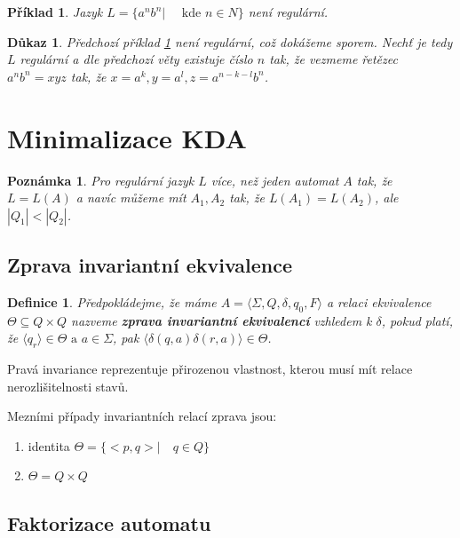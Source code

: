 \documentclass[10pt, a4paper, titlepage]{article}
\theoremstyle{note}
\newtheorem{definice}{Definice}
\newtheorem{dukaz}{Důkaz}
\newtheorem{priklad}{Příklad}
\newtheorem{poznamka}{Poznámka}
\begin{document}
\begin{priklad}\label{priklad-reg}
 Jazyk $L = \lbrace a^{n}b^{n} | \quad \text{ kde } n \in N \rbrace$ není regulární.
\end{priklad}

\begin{dukaz}
 Předchozí příklad \ref{priklad-reg} není regulární, což dokážeme sporem. Nechť je tedy $L$ regulární a dle předchozí
věty existuje číslo $n$ tak, že vezmeme řetězec $a^{n}b^{n} = xyz$ tak, že $x = a^{k}, y = a^{l}, z = a^{n-k-l}b^{n}$.
\end{dukaz}


\section{Minimalizace KDA}

\begin{poznamka}
Pro regulární jazyk $L$ více, než jeden automat $A$ tak, že $L = L(A)$ a navíc můžeme mít $A_{1}, A_{2}$ tak, že
$L(A_{1}) = L(A_{2})$, ale $|Q_{1}| < |Q_{2}|$.
\end{poznamka}

\subsection{Zprava invariantní ekvivalence}

\begin{definice}
Předpokládejme, že máme $A = \langle \Sigma, Q, \delta, q_{0}, F \rangle$ a relaci ekvivalence $\Theta \subseteq Q \times Q$ nazveme
\textbf{zprava invariantní ekvivalencí} vzhledem k $\delta$, pokud platí, že $\langle q_{r}  \rangle \in \Theta \text{ a } a \in \Sigma$,
pak $\langle  \delta(q, a) \delta(r, a) \rangle \in \Theta$.
\end{definice}

Pravá invariance reprezentuje přirozenou vlastnost, kterou musí mít relace nerozlišitelnosti stavů.

Mezními případy invariantních relací zprava jsou:
\begin{enumerate}
\item 
identita $\Theta = \lbrace <p,q> | \quad q \in Q \rbrace$
\item
$\Theta = Q \times Q$
\end{enumerate}

\subsection{Faktorizace automatu}
\end{document}

